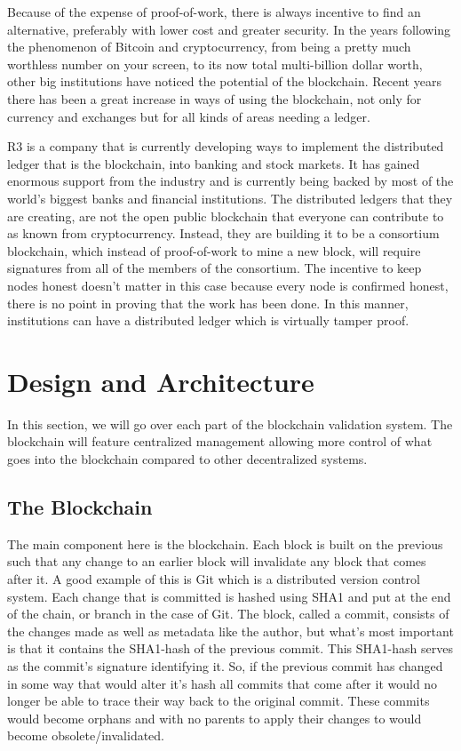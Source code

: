 \documentclass[11pt]{article}
\begin{document}
Because of the expense of proof-of-work, there is always incentive to find an alternative, preferably with lower cost and greater security. In the years following the phenomenon of Bitcoin and cryptocurrency, from being a pretty much worthless number on your screen, to its now total multi-billion dollar worth, other big institutions have noticed the potential of the blockchain. Recent years there has been a great increase in ways of using the blockchain, not only for currency and exchanges but for all kinds of areas needing a ledger.

R3 is a company that is currently developing ways to implement the distributed ledger that is the blockchain, into banking and stock markets. It has gained enormous support from the industry and is currently being backed by most of the world's biggest banks and financial institutions. The distributed ledgers that they are creating, are not the open public blockchain that everyone can contribute to as known from cryptocurrency. Instead, they are building it to be a consortium blockchain, which instead of proof-of-work to mine a new block, will require signatures from all of the members of the consortium. The incentive to keep nodes honest doesn't matter in this case because every node is confirmed honest, there is no point in proving that the work has been done. In this manner, institutions can have a distributed ledger which is virtually tamper proof. 


\section{Design and Architecture}

In this section, we will go over each part of the blockchain validation system. The blockchain will feature centralized management allowing more control of what goes into the blockchain compared to other decentralized systems.

\subsection{The Blockchain}
The main component here is the blockchain. Each block is built on the previous such that any change to an earlier block will invalidate any block that comes after it. A good example of this is Git which is a distributed version control system. Each change that is committed is hashed using SHA1 and put at the end of the chain, or branch in the case of Git. The block, called a commit, consists of the changes made as well as metadata like the author, but what's most important is that it contains the SHA1-hash of the previous commit. This SHA1-hash serves as the commit's signature identifying it. So, if the previous commit has changed in some way that would alter it's hash all commits that come after it would no longer be able to trace their way back to the original commit. These commits would become orphans and with no parents to apply their changes to would become obsolete/invalidated.
\end{document}
